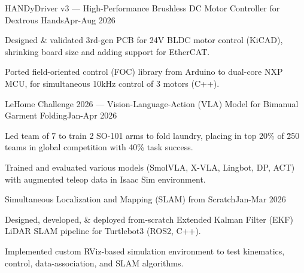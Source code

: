 \documentclass[letterpaper,10pt]{article}
\begin{document}
\begin{jobshort}{HANDyDriver v3 --- High-Performance Brushless DC Motor Controller for Dextrous Hands}{}{Apr-Aug 2026}
    \item Designed \& validated 3rd-gen PCB for 24V BLDC motor control (KiCAD), shrinking board size and adding support for EtherCAT.
    \item Ported field-oriented control (FOC) library from Arduino to dual-core NXP MCU, for simultaneous 10kHz control of 3 motors (C++).
\end{jobshort}

\begin{jobshort}{LeHome Challenge 2026 --- Vision-Language-Action (VLA) Model for Bimanual Garment Folding}{}{Jan-Apr 2026}
    \item Led team of 7 to train 2 SO-101 arms to fold laundry, placing in top 20\% of \~250 teams in global competition with 40\% task success.
    \item Trained and evaluated various models (SmolVLA, X-VLA, Lingbot, DP, ACT) with augmented teleop data in Isaac Sim environment.
\end{jobshort}

\begin{jobshort}{Simultaneous Localization and Mapping (SLAM) from Scratch}{}{Jan-Mar 2026}
    \item Designed, developed, \& deployed from-scratch Extended Kalman Filter (EKF) LiDAR SLAM pipeline for Turtlebot3 (ROS2, C++).
    \item Implemented custom RViz-based simulation environment to test kinematics, control, data-association, and SLAM algorithms.
\end{jobshort}
\end{document}
